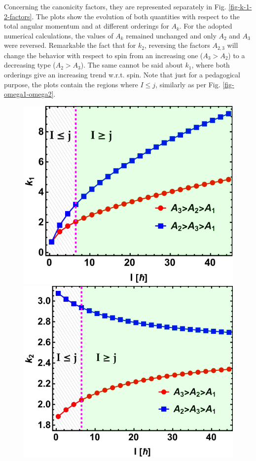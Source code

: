 Concerning the canonicity factors, they are represented separately in Fig. \ref{fig-k-1-2-factors}. The plots show the evolution of both quantities with respect to the total angular momentum and at different orderings for $A_k$. For the adopted numerical calculations, the values of $A_k$ remained unchanged and only $A_2$ and $A_3$ were reversed. Remarkable the fact that for $k_2$, reversing the factors $A_{2,3}$ will change the behavior with respect to spin from an increasing one ($A_3>A_2$) to a decreasing type ($A_2>A_3$). The same cannot be said about $k_1$, where both orderings give an increasing trend w.r.t. spin. Note that just for a pedagogical purpose, the plots contain the regions where $I\leq j$, similarly as per Fig. \ref{fig-omega1-omega2}.
\begin{figure}
    \centering
    \includegraphics[scale=0.7]{Chapters/Figures/k1_factor.pdf}
    \includegraphics[scale=0.7]{Chapters/Figures/k2_factor.pdf}

\end{figure}

